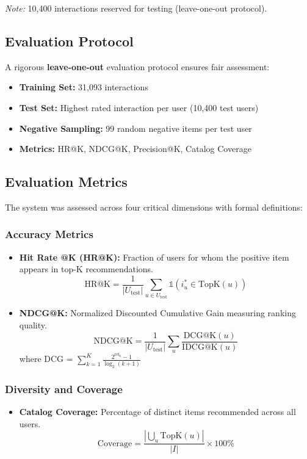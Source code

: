 \documentclass[12pt,a4paper]{report}
\begin{document}
{\textit{Note:} 10,400 interactions reserved for testing (leave-one-out protocol).

\subsection{Evaluation Protocol}
A rigorous \textbf{leave-one-out} evaluation protocol ensures fair assessment:

\begin{itemize}
    \item \textbf{Training Set:} 31,093 interactions
    \item \textbf{Test Set:} Highest rated interaction per user (10,400 test users)
    \item \textbf{Negative Sampling:} 99 random negative items per test user
    \item \textbf{Metrics:} HR@K, NDCG@K, Precision@K, Catalog Coverage
\end{itemize}

\subsection{Evaluation Metrics}
The system was assessed across four critical dimensions with formal definitions:

\subsubsection{Accuracy Metrics}
\begin{itemize}
    \item \textbf{Hit Rate @K (HR@K):} Fraction of users for whom the positive item appears in top-K recommendations.
    \begin{equation}
    \text{HR@K} = \frac{1}{|U_{\text{test}}|} \sum_{u \in U_{\text{test}}} \mathbb{1}(i_u^* \in \text{TopK}(u))
    \end{equation}
    
    \item \textbf{NDCG@K:} Normalized Discounted Cumulative Gain measuring ranking quality.
    \begin{equation}
    \text{NDCG@K} = \frac{1}{|U_{\text{test}}|} \sum_{u} \frac{\text{DCG@K}(u)}{\text{IDCG@K}(u)}
    \end{equation}
    where DCG = $\sum_{k=1}^{K} \frac{2^{\text{rel}_k} - 1}{\log_2(k+1)}$
\end{itemize}

\subsubsection{Diversity and Coverage}
\begin{itemize}
    \item \textbf{Catalog Coverage:} Percentage of distinct items recommended across all users.
    \begin{equation}
    \text{Coverage} = \frac{|\bigcup_{u} \text{TopK}(u)|}{|I|} \times 100\%
    \end{equation}
\end{itemize}

}
\end{document}
